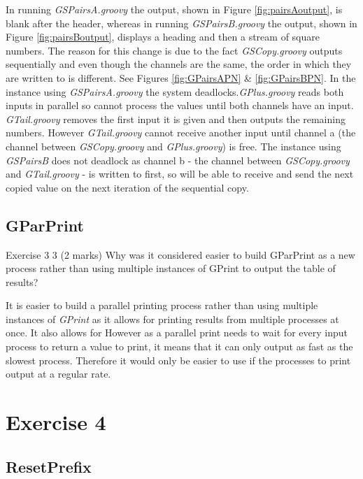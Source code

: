 \documentclass[10pt, a4paper]{article}
\begin{document}
	In running \textit{GSPairsA.groovy} the output, shown in Figure \ref{fig:pairsAoutput}, is blank after the header, whereas in running \textit{GSPairsB.groovy} the output, shown in Figure \ref{fig:pairsBoutput}, displays a heading and then a stream of square numbers. The reason for this change is due to the fact \textit{GSCopy.groovy} outputs sequentially and even though the channels are the same, the order in which they are written to is different. See Figures \ref{fig:GPairsAPN} \& \ref{fig:GPairsBPN}. In the instance using \textit{GSPairsA.groovy} the system deadlocks.\textit{GPlus.groovy} reads both inputs in parallel so cannot process the values until both channels have an input. \textit{GTail.groovy} removes the first input it is given and then outputs the remaining numbers. However \textit{GTail.groovy} cannot receive another input until channel a (the channel between \textit{GSCopy.groovy} and \textit{GPlus.groovy}) is free. The instance using \textit{GSPairsB} does not deadlock as channel b - the channel between \textit{GSCopy.groovy} and \textit{GTail.groovy} - is written to first, so will be able to receive and send the next copied value on the next iteration of the sequential copy.
	
	\subsection{GParPrint}
	
	   Exercise 3 3   (2 marks)
	Why was it considered easier to build GParPrint as a new process rather than using multiple instances of GPrint to output the table of results?
	
	It is easier to build a parallel printing process rather than using multiple instances of \textit{GPrint} as it allows for printing results from multiple processes at once. It also allows for %
	However as a parallel print needs to wait for every input process to return a value to print, it means that it can only output as fast as the slowest process. Therefore it would only be easier to use if the processes to print output at a regular rate.
	
	\setcounter{section}{4}
	\section*{Exercise 4}
	
	\setcounter{subsection}{0}
	\subsection{ResetPrefix}
\end{document}
